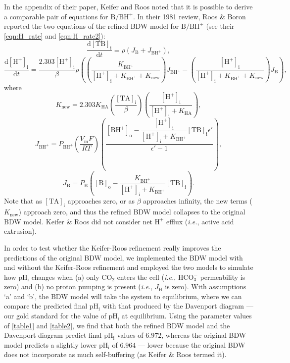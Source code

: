 \documentclass[fleqn,10pt]{physiome}
\begin{document}
In the appendix of their paper, Keifer and Roos noted that it is possible to derive a comparable pair of equations for $\mathrm{B}/\mathrm{BH^+}$. In their 1981 review, Roos \& Boron reported the two equations of the refined BDW model for $\mathrm{B}/\mathrm{BH^+}$ (see their \autoref{eqn:H_rate} and \autoref{eqn:H_rate2}): 
\begin{equation*}
\dfrac{\mathrm{d[TB]_i}}{\mathrm{d}t}=\rho\left(J_\mathrm{B}+J_\mathrm{BH^+} \right),
\label{eqn:keifer2}
\end{equation*}
\begin{equation*}
\dfrac{\mathrm{d[H^+]_i}}{\mathrm{d}t}=\dfrac{2.303\mathrm{[H^+]_i}}{\beta}\rho\left(\left(\dfrac{K_\mathrm{BH^+}}{\mathrm{[H^+]_i}+K_\mathrm{BH^+}+{K_\mathrm{new}}}\right)J_\mathrm{BH^+}-\left(\dfrac{\mathrm{[H^+]_i}}{\mathrm{[H^+]_i}+K_\mathrm{BH^+}+{{K_\mathrm{new}}}}\right)J_\mathrm{B}\right),
\label{eqn:keifer2}
\end{equation*}
where
\begin{equation*}
K_\mathrm{new}=2.303K_\mathrm{HA}\left( \dfrac{\mathrm{[TA]_i}}{\beta}\right)\left( \dfrac{\mathrm{[H^+]_i}}{\mathrm{[H^+]_i}+K_\mathrm{HA}}\right),
\end{equation*}
\begin{equation*}
J_\mathrm{BH^+}=P_\mathrm{BH^+}\left(\dfrac{V_\mathrm{m}F}{RT}\right)\left(\dfrac{\mathrm{[BH^+]_o}-\dfrac{\mathrm{[H^+]_i}}{\mathrm{[H^+]_i}+K_\mathrm{BH^+}}\mathrm{[TB]_i} \epsilon '}{\epsilon '-1}\right),
\end{equation*}
\begin{equation*}
J_\mathrm{B}=P_\mathrm{B}\left( \mathrm{[B]_o}-\dfrac{K_\mathrm{BH^+}}{\mathrm{[H^+]_i}+K_\mathrm{BH^+}}\mathrm{[TB]_i} \right).
\end{equation*}
Note that as $\mathrm{[TA]_i}$ approaches zero, or as $\beta$ approaches infinity, the new terms ($K_\mathrm{new}$) approach zero, and thus the refined BDW model collapses to the original BDW model. Keifer \& Roos did not consider net $\mathrm{H^+}$ efflux (\emph{i.e.}, active acid extrusion).

In order to test whether the Keifer-Roos refinement really improves the predictions of the original BDW model, we implemented the BDW model with and without the Keifer-Roos refinement and employed the two models to simulate how $\mathrm{pH_i}$  changes when (a) only $\mathrm{CO_2}$ enters the cell (\emph{i.e.}, $\mathrm{HCO_3^-}$ permeability is zero) and (b) no proton pumping is present (\emph{i.e.}, $J_\mathrm{H}$ is zero). With assumptions `a' and `b', the BDW model will take the system to equilibrium, where we can compare the predicted final $\mathrm{pH_i}$  with that produced by the Davenport diagram --- our gold standard for the value of $\mathrm{pH_i}$ at equilibrium. Using the parameter values of \autoref{table1} and \autoref{table2}, we find that both the refined BDW model and the Davenport diagram predict final $\mathrm{pH_i}$ values of $6.972$, whereas the original BDW model predicts a slightly lower $\mathrm{pH_i}$ of $6.964$ --- lower because the original BDW does not incorporate as much self-buffering (as Keifer \& Roos termed it).
\end{document}
